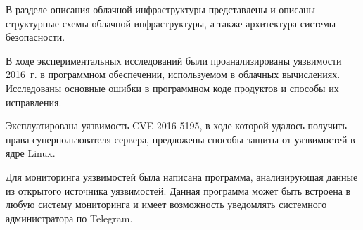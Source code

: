 В разделе описания облачной инфраструктуры представлены и описаны структурные схемы облачной инфраструктуры, а также архитектура системы безопасности.

В ходе экспериментальных исследований были проанализированы уязвимости 2016~г. в программном обеспечении, используемом в облачных вычислениях.
Исследованы основные ошибки в программном коде продуктов и способы их исправления.

Эксплуатирована уязвимость CVE-2016-5195, в ходе которой удалось получить права суперпользователя сервера, предложены способы защиты от уязвимостей в ядре Linux.

Для мониторинга уязвимостей была написана программа, анализирующая данные из открытого источника уязвимостей.
Данная программа может быть встроена в любую систему мониторинга и имеет возможность уведомлять системного администратора по Telegram.

\clearpage
